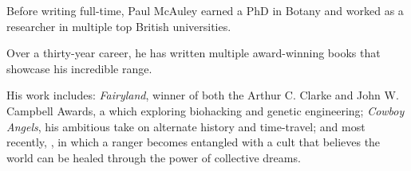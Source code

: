 Before writing full-time, Paul McAuley earned a PhD in Botany and worked as a researcher in multiple top British universities. 

Over a thirty-year career, he has written multiple award-winning books that showcase his incredible range.

His work includes: \textit{Fairyland}, winner of both the Arthur C. Clarke and John W. Campbell Awards, a which exploring biohacking and genetic engineering; \textit{Cowboy Angels}, his ambitious take on alternate history and time-travel; and most recently, , in which a ranger becomes entangled with a cult that believes the world can be healed through the power of collective dreams.


